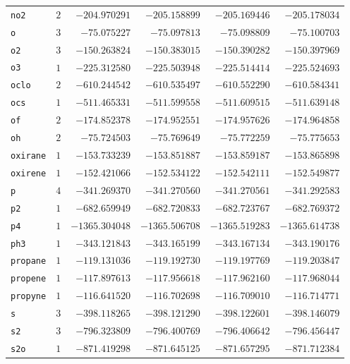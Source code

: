 {\begin{longtable}{@{}lrrrrr@{}}
    \texttt{no2} & $2$ & $-204.970291$ & $-205.158899$ & $-205.169446$ & $-205.178034$ \\
    \texttt{o} & $3$ & $-75.075227$ & $-75.097813$ & $-75.098809$ & $-75.100703$ \\
    \texttt{o2} & $3$ & $-150.263824$ & $-150.383015$ & $-150.390282$ & $-150.397969$ \\
    \texttt{o3} & $1$ & $-225.312580$ & $-225.503948$ & $-225.514414$ & $-225.524693$ \\
    \texttt{oclo} & $2$ & $-610.244542$ & $-610.535497$ & $-610.552290$ & $-610.584341$ \\
    \texttt{ocs} & $1$ & $-511.465331$ & $-511.599558$ & $-511.609515$ & $-511.639148$ \\
    \texttt{of} & $2$ & $-174.852378$ & $-174.952551$ & $-174.957626$ & $-174.964858$ \\
    \texttt{oh} & $2$ & $-75.724503$ & $-75.769649$ & $-75.772259$ & $-75.775653$ \\
    \texttt{oxirane} & $1$ & $-153.733239$ & $-153.851887$ & $-153.859187$ & $-153.865898$ \\
    \texttt{oxirene} & $1$ & $-152.421066$ & $-152.534122$ & $-152.542111$ & $-152.549877$ \\
    \texttt{p} & $4$ & $-341.269370$ & $-341.270560$ & $-341.270561$ & $-341.292583$ \\
    \texttt{p2} & $1$ & $-682.659949$ & $-682.720833$ & $-682.723767$ & $-682.769372$ \\
    \texttt{p4} & $1$ & $-1365.304048$ & $-1365.506708$ & $-1365.519283$ & $-1365.614738$ \\
    \texttt{ph3} & $1$ & $-343.121843$ & $-343.165199$ & $-343.167134$ & $-343.190176$ \\
    \texttt{propane} & $1$ & $-119.131036$ & $-119.192730$ & $-119.197769$ & $-119.203847$ \\
    \texttt{propene} & $1$ & $-117.897613$ & $-117.956618$ & $-117.962160$ & $-117.968044$ \\
    \texttt{propyne} & $1$ & $-116.641520$ & $-116.702698$ & $-116.709010$ & $-116.714771$ \\
    \texttt{s} & $3$ & $-398.118265$ & $-398.121290$ & $-398.122601$ & $-398.146079$ \\
    \texttt{s2} & $3$ & $-796.323809$ & $-796.400769$ & $-796.406642$ & $-796.456447$ \\
    \texttt{s2o} & $1$ & $-871.419298$ & $-871.645125$ & $-871.657295$ & $-871.712384$ \\

\end{longtable}}
